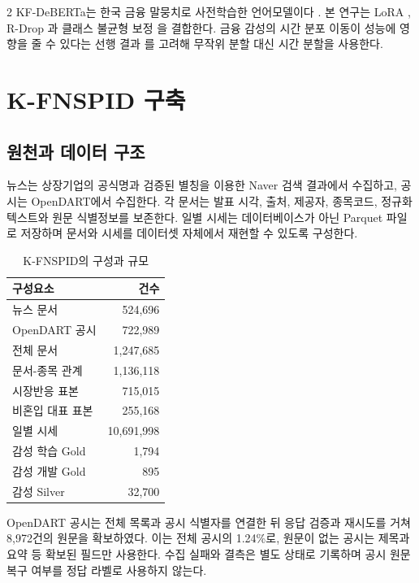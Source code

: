 \documentclass[10pt]{article}
\begin{document}
\begin{multicols}{2}
KF-DeBERTa는 한국 금융 말뭉치로 사전학습한 언어모델이다 \cite{jeon-etal-2023-kfdeberta}. 본 연구는 LoRA \cite{hu-etal-2022-lora}, R-Drop \cite{liang-etal-2021-rdrop}과 클래스 불균형 보정 \cite{cui-etal-2019-classbalanced}을 결합한다. 금융 감성의 시간 분포 이동이 성능에 영향을 줄 수 있다는 선행 결과 \cite{guo-etal-2023-predict}를 고려해 무작위 분할 대신 시간 분할을 사용한다.

\section{K-FNSPID 구축}

\subsection{원천과 데이터 구조}

뉴스는 상장기업의 공식명과 검증된 별칭을 이용한 Naver 검색 결과에서 수집하고, 공시는 OpenDART에서 수집한다. 각 문서는 발표 시각, 출처, 제공자, 종목코드, 정규화 텍스트와 원문 식별정보를 보존한다. 일별 시세는 데이터베이스가 아닌 Parquet 파일로 저장하며 문서와 시세를 데이터셋 자체에서 재현할 수 있도록 구성한다.

\begin{table}[H]
\centering
\small
\begin{tabular}{lr}
\toprule
구성요소 & 건수 \\
\midrule
뉴스 문서 & 524,696 \\
OpenDART 공시 & 722,989 \\
전체 문서 & 1,247,685 \\
문서-종목 관계 & 1,136,118 \\
시장반응 표본 & 715,015 \\
비혼입 대표 표본 & 255,168 \\
일별 시세 & 10,691,998 \\
감성 학습 Gold & 1,794 \\
감성 개발 Gold & 895 \\
감성 Silver & 32,700 \\
\bottomrule
\end{tabular}
\caption{K-FNSPID의 구성과 규모}
\label{tab:scale-ko}
\end{table}

OpenDART 공시는 전체 목록과 공시 식별자를 연결한 뒤 응답 검증과 재시도를 거쳐 8,972건의 원문을 확보하였다. 이는 전체 공시의 1.24\%로, 원문이 없는 공시는 제목과 요약 등 확보된 필드만 사용한다. 수집 실패와 결측은 별도 상태로 기록하며 공시 원문 복구 여부를 정답 라벨로 사용하지 않는다.


\end{multicols}
\end{document}
